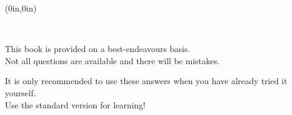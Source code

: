 \documentclass[openany,oneside]{memoir}
\begin{document}
\thispagestyle{empty}
\begin{textblock*}{0in}(0in,0in)
  \noindent\hfill
  \begin{minipage}[b][\stockheight][s]{.9\stockwidth}
  \end{minipage}
  \hspace*{1cm}
\end{textblock*}
\
    \vfill \EditionBanner

\bigskip 
\thispagestyle{empty}
\noindent This book is provided on a best-endeavours basis.\\ Not all questions are available and there will be mistakes. 

\bigskip \noindent It is only recommended to use these answers when you have already tried it yourself. \\Use the standard version for learning!
 
\newpage


\midsloppy





\end{document}

